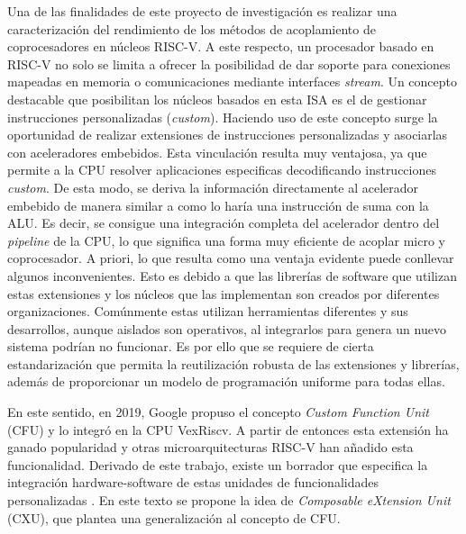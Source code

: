 Una de las finalidades de este proyecto de investigación es realizar una caracterización del rendimiento de los métodos de acoplamiento de coprocesadores en núcleos RISC-V.
A este respecto, un procesador basado en RISC-V no solo se limita a ofrecer la posibilidad de dar soporte para conexiones mapeadas en memoria o comunicaciones mediante interfaces \textit{stream}.
Un concepto destacable que posibilitan los núcleos basados en esta ISA es el de gestionar instrucciones personalizadas (\textit{custom}).
Haciendo uso de este concepto surge la oportunidad de realizar extensiones de instrucciones personalizadas y asociarlas con aceleradores embebidos.
Esta vinculación resulta muy ventajosa, ya que permite a la CPU resolver aplicaciones especificas decodificando instrucciones \textit{custom}.
De esta modo, se deriva la información directamente al acelerador embebido de manera similar a como lo haría una instrucción de suma con la ALU. 
Es decir, se consigue una integración completa del acelerador dentro del \textit{pipeline} de la CPU, lo que significa una forma muy eficiente de acoplar micro y coprocesador.
A priori, lo que resulta como una ventaja evidente puede conllevar algunos inconvenientes.
Esto es debido a que las librerías de software que utilizan estas extensiones y los núcleos que las implementan son creados por diferentes organizaciones.
Comúnmente estas utilizan herramientas diferentes y sus desarrollos, aunque aislados son operativos, al integrarlos para genera un nuevo sistema podrían no funcionar.
Es por ello que se requiere de cierta estandarización que permita la reutilización robusta de las extensiones y librerías, además de proporcionar un modelo de programación uniforme para todas ellas.

En este sentido, en 2019, Google propuso el concepto \textit{Custom Function Unit} (CFU) \cite{prakash23} y lo integró en la CPU VexRiscv.
A partir de entonces esta extensión ha ganado popularidad y otras microarquitecturas RISC-V han añadido esta funcionalidad.
Derivado de este trabajo, existe un borrador que especifica la integración hardware-software de estas unidades de funcionalidades personalizadas \cite{CFU-draft}. 
En este texto se propone la idea de \textit{Composable eXtension Unit} (CXU), que plantea una generalización al concepto de CFU. 

